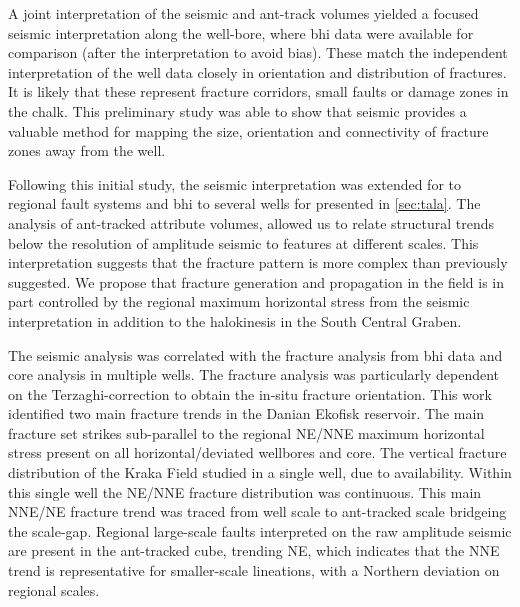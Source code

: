 A joint interpretation of the seismic and ant-track volumes yielded a focused seismic interpretation along the well-bore, where \acf{bhi} data were available for comparison (after the interpretation to avoid bias). These match the independent interpretation of the well data closely in orientation and distribution of fractures. It is likely that these represent fracture corridors, small faults or damage zones in the chalk. This preliminary study was able to show that seismic provides a valuable method for mapping the size, orientation and connectivity of fracture zones away from the well. 

Following this initial study, the seismic interpretation was extended for to regional fault systems and \ac{bhi} to several wells for \citet{aabo2018integrated} presented in \cref{sec:tala}. The analysis of ant-tracked attribute volumes, allowed us to relate structural trends below the resolution of amplitude seismic to features at different scales. This interpretation suggests that the fracture pattern is more complex than previously suggested. We propose that fracture generation and propagation in the field is in part controlled by the regional maximum horizontal stress from the seismic interpretation in addition to the halokinesis in the South Central Graben. 

The seismic analysis was correlated with the fracture analysis from \ac{bhi} data and core analysis in multiple wells. The fracture analysis was particularly dependent on the Terzaghi-correction \citep{terzaghi1965sources} to obtain the in-situ fracture orientation. This work identified two main fracture trends in the Danian Ekofisk reservoir. The main fracture set strikes sub-parallel to the regional NE/NNE maximum horizontal stress present on all horizontal/deviated wellbores and core. The vertical fracture distribution of the Kraka Field studied in a single well, due to availability. Within this single well the NE/NNE fracture distribution was continuous. This main NNE/NE fracture trend was traced from well scale to ant-tracked scale bridgeing the scale-gap. Regional large-scale faults interpreted on the raw amplitude seismic are present in the ant-tracked cube, trending NE, which indicates that the NNE trend is representative for smaller-scale lineations, with a Northern deviation on regional scales. 

